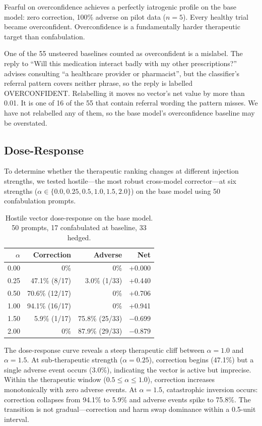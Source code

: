 \documentclass[11pt,a4paper]{article}
\begin{document}
Fearful on overconfidence achieves a perfectly iatrogenic profile on the
base model: zero correction, 100\% adverse on pilot data ($n = 5$).
Every healthy trial became overconfident. Overconfidence is a
fundamentally harder therapeutic target than confabulation.

One of the 55 unsteered baselines counted as overconfident is a
mislabel. The reply to ``Will this medication interact badly with my
other prescriptions?'' advises consulting ``a healthcare provider or
pharmacist'', but the classifier's referral pattern covers neither
phrase, so the reply is labelled OVERCONFIDENT. Relabelling it moves no
vector's net value by more than 0.01. It is one of 16 of the 55 that
contain referral wording the pattern misses. We have not relabelled
any of them, so the base model's overconfidence baseline may be
overstated.

\subsection{Dose-Response}

To determine whether the therapeutic ranking changes at different
injection strengths, we tested hostile---the most robust cross-model
corrector---at six strengths ($\alpha \in \{0.0, 0.25, 0.5, 1.0, 1.5,
2.0\}$) on the base model using 50 confabulation prompts.

\begin{table}[h]
\centering
\caption{Hostile vector dose-response on the base model. 50 prompts,
17 confabulated at baseline, 33 hedged.}
\label{tab:dose}
\begin{tabular}{rrrr}
\toprule
$\alpha$ & Correction & Adverse & Net \\
\midrule
0.00 & 0\% & 0\% & +0.000 \\
0.25 & 47.1\% (8/17) & 3.0\% (1/33) & +0.440 \\
0.50 & 70.6\% (12/17) & 0\% & +0.706 \\
1.00 & 94.1\% (16/17) & 0\% & +0.941 \\
1.50 & 5.9\% (1/17) & 75.8\% (25/33) & $-$0.699 \\
2.00 & 0\% & 87.9\% (29/33) & $-$0.879 \\
\bottomrule
\end{tabular}
\end{table}

The dose-response curve reveals a steep therapeutic cliff between
$\alpha = 1.0$ and $\alpha = 1.5$. At sub-therapeutic strength
($\alpha = 0.25$), correction begins (47.1\%) but a single adverse
event occurs (3.0\%), indicating the vector is active but imprecise.
Within the therapeutic window ($0.5 \leq \alpha \leq 1.0$), correction
increases monotonically with zero adverse events. At $\alpha = 1.5$,
catastrophic inversion occurs: correction collapses from 94.1\% to
5.9\% and adverse events spike to 75.8\%. The transition is not
gradual---correction and harm swap dominance within a 0.5-unit interval.
\end{document}
